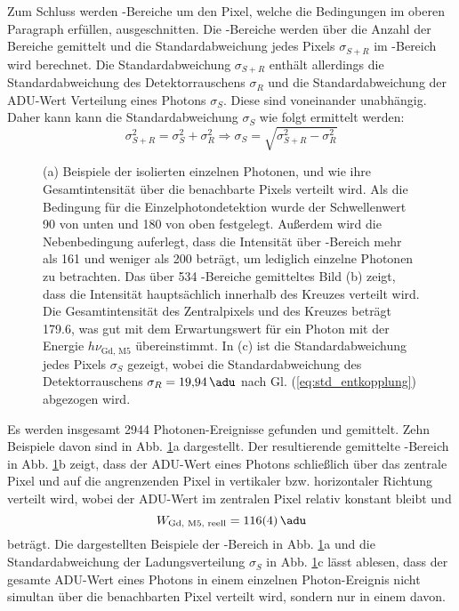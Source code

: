 \noindent
Zum Schluss werden -Bereiche um den Pixel, welche die Bedingungen im oberen Paragraph erfüllen, ausgeschnitten. Die -Bereiche werden über die Anzahl der Bereiche gemittelt und die Standardabweichung jedes Pixels $\sigma_{S+R}$ im -Bereich wird berechnet. Die Standardabweichung $\sigma_{S+R}$ enthält allerdings die Standardabweichung des Detektorrauschens $\sigma_{R}$ und die Standardabweichung der ADU-Wert Verteilung eines Photons $\sigma_{S}$. Diese sind voneinander unabhängig. Daher kann kann die Standardabweichung $\sigma_{S}$ wie folgt ermittelt werden:
\begin{equation}
    \sigma_{S+R}^2 = \sigma_{S}^2 + \sigma_{R}^2 \Rightarrow \sigma_{S} = \sqrt{\sigma_{S+R}^2 - \sigma_{R}^2}
    \label{eq:std_entkopplung}
\end{equation}
\begin{figure}[H]
    \centering
    
    \caption{(a) Beispiele der isolierten einzelnen Photonen, und wie ihre Gesamtintensität über die benachbarte Pixels verteilt wird. Als die Bedingung für die Einzelphotondetektion wurde der Schwellenwert \SI{90}{\adu} von unten und \SI{180}{\adu} von oben festgelegt. Außerdem wird die Nebenbedingung auferlegt, dass die Intensität über -Bereich mehr als \SI{161}{\adu} und weniger als \SI{200}{\adu} beträgt, um lediglich einzelne Photonen zu betrachten. Das über 534 -Bereiche gemitteltes Bild (b) zeigt, dass die Intensität hauptsächlich innerhalb des Kreuzes verteilt wird. Die Gesamtintensität des Zentralpixels und des Kreuzes beträgt \SI{179.6}{\adu}, was gut mit dem Erwartungswert für ein Photon mit der Energie $h\nu_\text{Gd, M5}$ übereinstimmt. In (c) ist die Standardabweichung jedes Pixels $\sigma_{S}$ gezeigt, wobei die Standardabweichung des Detektorrauschens $\sigma_R = \SI{19.94}{\adu}$ nach Gl. (\ref{eq:std_entkopplung}) abgezogen wird.}
    \label{fig:examples_average_std_5x5_hotspot}
\end{figure}
\noindent
Es werden insgesamt 2944 Photonen-Ereignisse gefunden und gemittelt. Zehn Beispiele davon sind in Abb. \ref{fig:examples_average_std_5x5_hotspot}a dargestellt. Der resultierende gemittelte -Bereich in Abb. \ref{fig:examples_average_std_5x5_hotspot}b zeigt, dass der ADU-Wert eines Photons schließlich über das zentrale Pixel und auf die angrenzenden Pixel in vertikaler bzw. horizontaler Richtung verteilt wird, wobei der ADU-Wert im zentralen Pixel relativ konstant bleibt und 
\begin{equation}
    W_\text{Gd, M5, reell}  = \SI{116(4)}{\adu} 
\end{equation}
beträgt. Die dargestellten Beispiele der -Bereich in Abb. \ref{fig:examples_average_std_5x5_hotspot}a und die Standardabweichung der Ladungsverteilung $\sigma_{S}$ in Abb. \ref{fig:examples_average_std_5x5_hotspot}c lässt ablesen, dass der gesamte ADU-Wert eines Photons in einem einzelnen Photon-Ereignis nicht simultan über die benachbarten Pixel verteilt wird, sondern nur in einem davon. 

